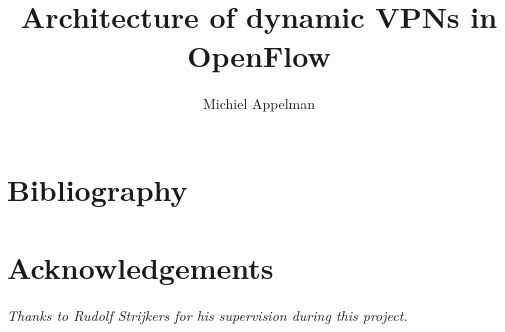 \documentclass[oneside,8pt,a4paper]{article}
\title{Architecture of dynamic VPNs in OpenFlow}
\author{Michiel Appelman}
\begin{document}
	
	
	
	\clearpage

	\acresetall
	\setlength{\parskip}{0ex plus 0.5ex minus 0.2ex}
	
	\tableofcontents
	\clearpage

	\listoffigures
	\listoftables
	\clearpage
	
	\acresetall
		\setlength{\parskip}{1.3ex plus 0.2ex minus 0.2ex}
		\pagestyle{fancy}
		\renewcommand{\sectionmark}[1]{%
		\markboth{#1}{}}
		\fancyhead[L]{\small{\nouppercase{\leftmark}}}
		\fancyhead[R]{\nouppercase{\emph{\chaptername\ \LARGE{\thesection}}}}
		\renewcommand{\headrulewidth}{0.5pt}
		

		
		\clearpage
		
				
		\clearpage
		
				
		\clearpage
		
		
						
		\clearpage
		
						
		\clearpage
		
		\appendix
		\noappendicestocpagenum
		\addappheadtotoc
		\pagestyle{fancy}
		\renewcommand{\sectionmark}[1]{%
		\markboth{#1}{}}
		\fancyhead[L]{\small{\nouppercase{\leftmark}}}
		\fancyhead[R]{\nouppercase{\emph{\appendixname\ \LARGE{\thesection}}}}
		\renewcommand{\headrulewidth}{0.5pt}

		
						
		\clearpage
		
		
		\clearpage

		\renewcommand*{\refname}{} %
		\section{Bibliography}
		
		

		\clearpage
		\pagestyle{empty}
		\vspace*{\fill}
		{\section*{Acknowledgements}
		\textsl{Thanks to Rudolf Strijkers for his supervision during this project.}}
		\vspace*{\fill}
\end{document}
